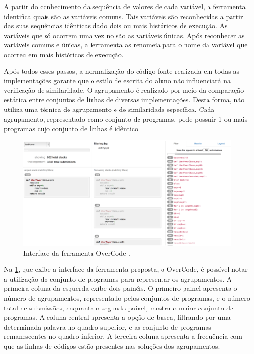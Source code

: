 		A partir do conhecimento da sequência de valores de cada variável, a ferramenta
		identifica quais são as variáveis comuns. Tais variáveis são reconhecidas a
		partir das suas sequências idênticas dado dois ou mais históricos de execução.
		As variáveis que só ocorrem uma vez no  são as variáveis únicas.
		Após reconhecer as variáveis comuns e únicas, a ferramenta as renomeia para o
		nome da variável que ocorreu em mais históricos de execução.
		
		Após todos esses passos, a normalização do código-fonte realizada em todas as
		implementações garante que o estilo de escrita do aluno não influenciará na
		verificação de similaridade. O agrupamento é realizado por meio da comparação
		estática entre conjuntos de linhas de diversas implementações. Desta forma, não
		utiliza uma técnica de agrupamento e de similaridade específica. Cada agrupamento,
		representado como conjunto de programas, pode possuir 1 ou mais programas cujo
		conjunto de linhas é idêntico.
		
		\begin{figure}[ht]
			\centering
			\includegraphics[width=.95\textwidth]{imagem/overCode.png}
			\caption[Interface da ferramenta OverCode]{Interface da ferramenta OverCode \cite{Glassman:2015}.}
			\label{fig:interfaceOverCode}
		\end{figure}
		
		Na \cref{fig:interfaceOverCode}, que exibe a interface da ferramenta proposta,
		o OverCode, é possível notar a utilização do conjunto de programas para
		representar os agrupamentos. A primeira coluna da esquerda exibe dois painéis.
		O primeiro painel apresenta o número de agrupamentos, representado pelos conjuntos de programas,
		e o número total de submissões, enquanto o segundo painel, mostra o maior
		conjunto de programas. A coluna central apresenta a opção de busca, filtrando
		por uma determinada palavra no quadro superior, e as conjunto de programas remanescentes no
		quadro inferior. A terceira coluna apresenta a frequência com que as linhas
		de códigos estão presentes nas soluções dos agrupamentos.

